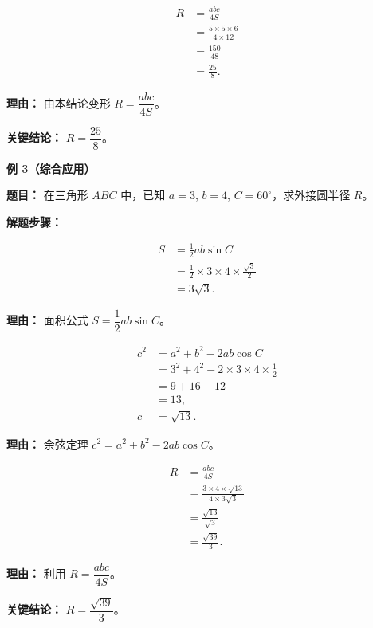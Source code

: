 \begin{examplebox}
\begin{description}[style=nextline, leftmargin=2.8em, labelsep=0.5em, itemsep=0.45em]
		\item[\textbf{第三步（求外接圆半径）：}]
			\[
				\begin{aligned}
					R &= \frac{abc}{4S} \\
					&= \frac{5\times5\times6}{4\times12} \\
					&= \frac{150}{48} \\
					&= \frac{25}{8}.
			\end{aligned}
			\]
			\par\textbf{理由：}
			由本结论变形 $R=\dfrac{abc}{4S}$。
	\end{description}

	\textbf{\textcolor{CExample}{关键结论：}}
	\textbf{$R=\dfrac{25}{8}$}。

	\medskip
	\textbf{\textcolor{CExample}{例 3（综合应用）}}

	\textbf{\textcolor{CExample}{题目：}}
	在三角形 $ABC$ 中，已知 $a=3$, $b=4$, $C=60^\circ$，求外接圆半径 $R$。

	\textbf{\textcolor{CExample}{解题步骤：}}
	\begin{description}[style=nextline, leftmargin=2.8em, labelsep=0.5em, itemsep=0.45em]
		\item[\textbf{第一步（求面积 $S$）：}]
			\[
				\begin{aligned}
					S &= \frac12 ab\sin C \\
					&= \frac12\times3\times4\times\frac{\sqrt3}{2} \\
					&= 3\sqrt3.
			\end{aligned}
			\]
			\par\textbf{理由：}
			面积公式 $S=\dfrac12 ab\sin C$。

		\item[\textbf{第二步（求第三边 $c$）：}]
			\[
				\begin{aligned}
					c^2 &= a^2+b^2-2ab\cos C \\
					&= 3^2+4^2-2\times3\times4\times\frac12 \\
					&= 9+16-12 \\
					&= 13, \\
					c   &= \sqrt{13}.
			\end{aligned}
			\]
			\par\textbf{理由：}
			余弦定理 $c^2=a^2+b^2-2ab\cos C$。

		\item[\textbf{第三步（求外接圆半径）：}]
			\[
				\begin{aligned}
					R &= \frac{abc}{4S} \\
					&= \frac{3\times4\times\sqrt{13}}{4\times3\sqrt3} \\
					&= \frac{\sqrt{13}}{\sqrt3} \\
					&= \frac{\sqrt{39}}{3}.
			\end{aligned}
			\]
			\par\textbf{理由：}
			利用 $R=\dfrac{abc}{4S}$。
	\end{description}

	\textbf{\textcolor{CExample}{关键结论：}}
	\textbf{$R=\dfrac{\sqrt{39}}{3}$}。
\end{examplebox}
